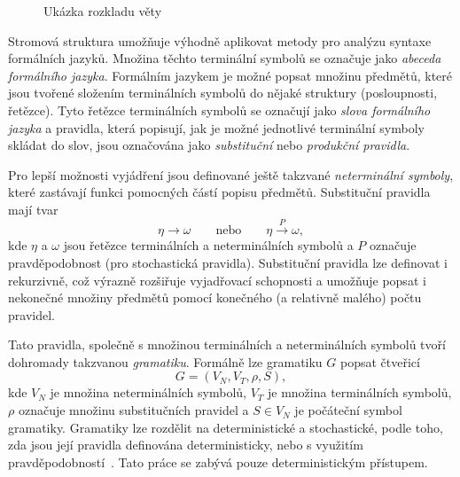 \begin{figure}[H]
	\caption{Ukázka rozkladu věty}\label{fig:example_car_fix}
\end{figure}

Stromová struktura umožňuje výhodně aplikovat metody pro analýzu syntaxe formálních jazyků.
Množina těchto terminální symbolů se označuje jako \emph{abeceda formálního jazyka}.
Formálním jazykem je možné popsat množinu předmětů, které jsou tvořené složením terminálních symbolů do nějaké struktury (posloupnosti, řetězce).
Tyto řetězce terminálních symbolů se označují jako \emph{slova formálního jazyka} a pravidla,
která popisují, jak je možné jednotlivé terminální symboly skládat do slov, jsou označována jako \emph{substituční} nebo \emph{produkční pravidla}.

Pro lepší možnosti vyjádření jsou definované ještě takzvané \emph{neterminální symboly}, které zastávají funkci pomocných částí popisu předmětů.
Substituční pravidla mají tvar
\[
	\eta \to \omega \qquad \text{nebo} \qquad \eta \xrightarrow{P} \omega,
\]
kde $\eta$ a $\omega$ jsou řetězce terminálních a neterminálních symbolů a $P$ označuje pravděpodobnost (pro stochastická pravidla).
Substituční pravidla lze definovat i rekurzivně, což výrazně rozšiřuje vyjadřovací schopnosti a umožňuje popsat i nekonečné množiny předmětů
pomocí konečného (a relativně malého) počtu pravidel.~\cite{PsutkaJ_2006_Mluvimes}

Tato pravidla, společně s množinou terminálních a neterminálních symbolů tvoří dohromady takzvanou \emph{gramatiku}.
Formálně lze gramatiku $G$ popsat čtveřicí
\[
	G = (V_{N}, V_{T}, \rho, S),
\]
kde $V_{N}$ je množina neterminálních symbolů, $V_{T}$ je množina terminálních symbolů,
$\rho$ označuje množinu substitučních pravidel a $S \in V_{N}$ je počáteční symbol gramatiky.
Gramatiky lze rozdělit na deterministické a stochastické, podle toho, zda jsou její pravidla definována deterministicky,
nebo s využitím pravděpodobností~\cite{PsutkaJ_2006_Mluvimes}.
Tato práce se zabývá pouze deterministickým přístupem.

